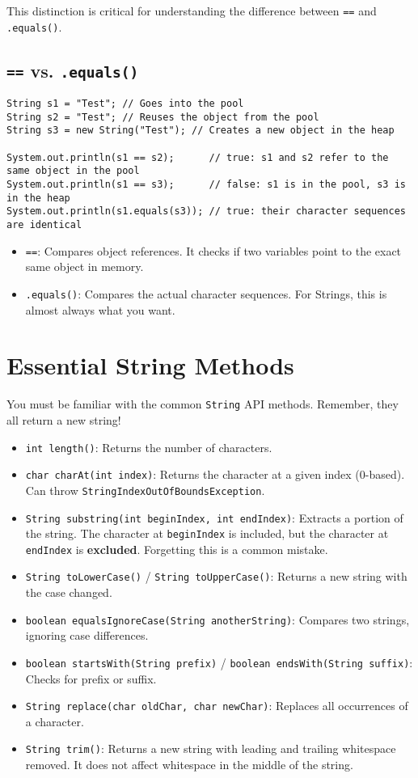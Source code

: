 \documentclass[12pt]{article}
\begin{document}
\begin{enumerate}[label=(\arabic*)]
This distinction is critical for understanding the difference between \texttt{==} and \texttt{.equals()}.

\subsection*{\texttt{==} vs. \texttt{.equals()}}
\begin{verbatim}
String s1 = "Test"; // Goes into the pool
String s2 = "Test"; // Reuses the object from the pool
String s3 = new String("Test"); // Creates a new object in the heap

System.out.println(s1 == s2);      // true: s1 and s2 refer to the same object in the pool
System.out.println(s1 == s3);      // false: s1 is in the pool, s3 is in the heap
System.out.println(s1.equals(s3)); // true: their character sequences are identical
\end{verbatim}
\begin{itemize}
    \item \texttt{==}: Compares object references. It checks if two variables point to the exact same object in memory.
    \item \texttt{.equals()}: Compares the actual character sequences. For Strings, this is almost always what you want.
\end{itemize}

\section{Essential String Methods}
You must be familiar with the common \texttt{String} API methods. Remember, they all return a new string!
\begin{itemize}
    \item \texttt{int length()}: Returns the number of characters.
    \item \texttt{char charAt(int index)}: Returns the character at a given index (0-based). Can throw \texttt{StringIndexOutOfBoundsException}.
    \item \texttt{String substring(int beginIndex, int endIndex)}: Extracts a portion of the string. The character at \texttt{beginIndex} is included, but the character at \texttt{endIndex} is \textbf{excluded}. Forgetting this is a common mistake.
    \item \texttt{String toLowerCase()} / \texttt{String toUpperCase()}: Returns a new string with the case changed.
    \item \texttt{boolean equalsIgnoreCase(String anotherString)}: Compares two strings, ignoring case differences.
    \item \texttt{boolean startsWith(String prefix)} / \texttt{boolean endsWith(String suffix)}: Checks for prefix or suffix.
    \item \texttt{String replace(char oldChar, char newChar)}: Replaces all occurrences of a character.
    \item \texttt{String trim()}: Returns a new string with leading and trailing whitespace removed. It does not affect whitespace in the middle of the string.
\end{itemize}


\end{enumerate}
\end{document}

